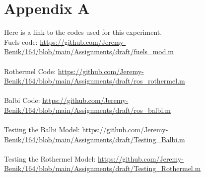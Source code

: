 \documentclass{article}
\begin{document}
\newpage



\newpage
\section{Appendix A}

Here is a link to the codes used for this experiment. \\
Fuels code: \url{https://github.com/Jeremy-Benik/164/blob/main/Assignments/draft/fuels_mod.m} \\
\\
Rothermel Code:  \url{https://github.com/Jeremy-Benik/164/blob/main/Assignments/draft/ros_rothermel.m} \\
\\
Balbi Code: \url{https://github.com/Jeremy-Benik/164/blob/main/Assignments/draft/ros_balbi.m} \\
\\
Testing the Balbi Model: \url{https://github.com/Jeremy-Benik/164/blob/main/Assignments/draft/Testing_Balbi.m}\\
\\
Testing the Rothermel Model: \url{https://github.com/Jeremy-Benik/164/blob/main/Assignments/draft/Testing_Rothermel.m}\\
\end{document}
